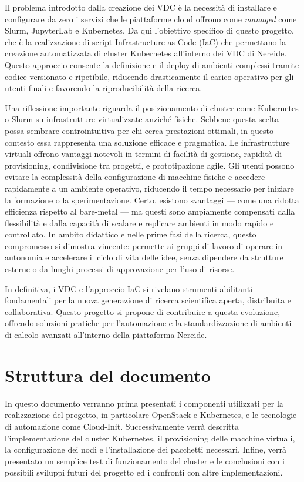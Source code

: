 \documentclass[12pt,a4paper,openright,twoside]{book}
\begin{document}
Il problema introdotto dalla creazione dei VDC è la necessità di installare e configurare da zero i servizi che le piattaforme cloud offrono come \textit{managed} come Slurm, JupyterLab e Kubernetes. 
Da qui l'obiettivo specifico di questo progetto, che è la realizzazione di script Infrastructure-as-Code (IaC) che permettano la creazione automatizzata di cluster Kubernetes all'interno dei VDC di Nereide.
Questo approccio consente la definizione e il deploy di ambienti complessi tramite codice versionato e ripetibile, riducendo drasticamente il carico operativo per gli utenti finali e favorendo la riproducibilità della ricerca.

Una riflessione importante riguarda il posizionamento di cluster come Kubernetes o Slurm su infrastrutture virtualizzate anziché fisiche.
Sebbene questa scelta possa sembrare controintuitiva per chi cerca prestazioni ottimali, in questo contesto essa rappresenta una soluzione efficace e pragmatica.
Le infrastrutture virtuali offrono vantaggi notevoli in termini di facilità di gestione, rapidità di provisioning, condivisione tra progetti, e prototipazione agile.
Gli utenti possono evitare la complessità della configurazione di macchine fisiche e accedere rapidamente a un ambiente operativo, riducendo il tempo necessario per iniziare la formazione o la sperimentazione.
Certo, esistono svantaggi — come una ridotta efficienza rispetto al bare-metal — ma questi sono ampiamente compensati dalla flessibilità e dalla capacità di scalare e replicare ambienti in modo rapido e controllato.
In ambito didattico e nelle prime fasi della ricerca, questo compromesso si dimostra vincente: permette ai gruppi di lavoro di operare in autonomia e accelerare il ciclo di vita delle idee, senza dipendere da strutture
esterne o da lunghi processi di approvazione per l'uso di risorse.

In definitiva, i VDC e l'approccio IaC si rivelano strumenti abilitanti fondamentali per la nuova generazione di ricerca scientifica aperta, distribuita e collaborativa.
Questo progetto si propone di contribuire a questa evoluzione, offrendo soluzioni pratiche per l'automazione e la standardizzazione di ambienti di calcolo avanzati all'interno della piattaforma Nereide.

\section{Struttura del documento}
In questo documento verranno prima presentati i componenti utilizzati per la realizzazione del progetto, in particolare OpenStack e Kubernetes, e le tecnologie di automazione come Cloud-Init.
Successivamente verrà descritta l'implementazione del cluster Kubernetes, il provisioning delle macchine virtuali, la configurazione dei nodi e l'installazione dei pacchetti necessari.
Infine, verrà presentato un semplice test di funzionamento del cluster e le conclusioni con i possibili sviluppi futuri del progetto ed i confronti con altre implementazioni. 
\end{document}
